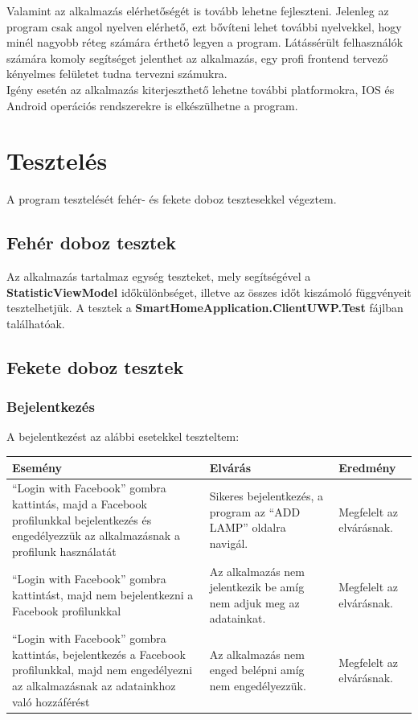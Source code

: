 \documentclass[a4paper,12pt]{report}
\begin{document}
    Valamint az alkalmazás elérhetőségét is tovább lehetne fejleszteni. Jelenleg az program csak angol nyelven elérhető, ezt bővíteni lehet
    további nyelvekkel, hogy minél nagyobb réteg számára érthető legyen a program. Látássérült felhasználók számára komoly segítséget jelenthet
    az alkalmazás, egy profi frontend tervező kényelmes felületet tudna tervezni számukra.\\

    Igény esetén az alkalmazás kiterjeszthető lehetne további platformokra, IOS és Android operációs rendszerekre is elkészülhetne
    a program.

\section{Tesztelés}
    A program tesztelését fehér- és fekete doboz tesztesekkel végeztem.

\subsection{Fehér doboz tesztek}
    Az alkalmazás tartalmaz egység teszteket, mely segítségével a \textbf{StatisticViewModel} időkülönbséget, illetve az összes időt
    kiszámoló függvényeit tesztelhetjük. A tesztek a \textbf{SmartHomeApplication.ClientUWP.Test} fájlban találhatóak.

\subsection{Fekete doboz tesztek}

\subsubsection{Bejelentkezés}
    A bejelentkezést az alábbi esetekkel teszteltem:\\

\begin{center}
    \begin{tabular}{ | m{4.5cm} | m{4.5cm} | m{4.5cm} |}
        \hline
        Esemény & Elvárás & Eredmény \\ \hline
        ``Login with Facebook'' gombra kattintás, majd a Facebook profilunkkal bejelentkezés és engedélyezzük az alkalmazásnak
        a profilunk használatát & Sikeres bejelentkezés, a program az ``ADD LAMP'' oldalra navigál. & Megfelelt az elvárásnak. \\ \hline
        ``Login with Facebook'' gombra kattintást, majd nem bejelentkezni a Facebook profilunkkal & Az alkalmazás nem jelentkezik be
        amíg nem adjuk meg az adatainkat. & Megfelelt az elvárásnak. \\ \hline
        ``Login with Facebook'' gombra kattintás, bejelentkezés a Facebook profilunkkal, majd nem engedélyezni az alkalmazásnak az
        adatainkhoz való hozzáférést & Az alkalmazás nem enged belépni amíg nem engedélyezzük. & Megfelelt az elvárásnak. \\ \hline
        \hline
    \end{tabular}
\end{center}
\end{document}
